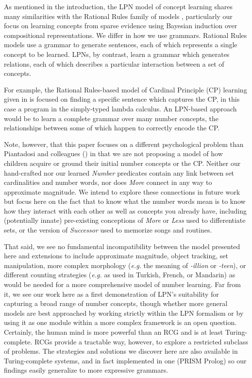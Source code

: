 \documentclass[10pt,letterpaper]{article}
\begin{document}
As mentioned in the introduction, the LPN model of concept learning
shares many similarities with the Rational Rules family of models
\citep{goodman2008rational,T.D.Ullman:2012:1b1b6,PianGoodTen2012},
particularly our focus on learning concepts from sparse evidence using
Bayesian induction over compositional representations. We differ in
how we use grammars. Rational Rules models use a grammar to generate
sentences, each of which represents a single concept to be learned.
LPNs, by contrast, learn a grammar which generates relations, each of
which describes a particular interaction between a set of concepts.

For example, the Rational Rules-based model of Cardinal Principle (CP)
learning given in \citep{PianGoodTen2012} is focused on finding a
specific sentence which captures the CP, in this case a program in the
simply-typed lambda calculus. An LPN-based approach would be to learn
a complete grammar over many number concepts, the relationships
between some of which happen to correctly encode the CP.

Note, however, that this paper focuses on a different psychological
problem than Piantadosi and colleagues (\citeyear{PianGoodTen2012}) in
that we are not proposing a model of how children acquire or ground
their initial number concepts or the CP. Neither our hand-crafted nor
our learned \emph{Number} predicates contain any link between set
cardinalities and number words, nor does \emph{More} connect in any
way to approximate magnitude. We intend to explore these connections
in future work but focus here on the fact that to know what the number
words mean is to know how they interact with each other as well as
concepts you already have, including (potentially innate) pre-existing
conceptions of \emph{More} or \emph{Less} used to differentiate sets,
or the version of \emph{Successor} used to memorize songs and
routines.

That said, we see no fundamental incompatibility between the model
presented here and extensions to include approximate magnitude, object
tracking, set manipulation, more complex morphology ({\it e.g.} the
meaning of \emph{-illion} or \emph{-teen}), or different counting
strategies ({\it e.g.} as used in Turkish, French, or Mandarin) as
would be needed for a more comprehensive model of number learning. Far
from it, we see our work here as a first demonstration of LPN's
suitability for capturing a broad range of number concepts, though
whether more general models are best approached by working strictly
within the LPN formalism or by using it as one module within a more
complex framework is an open question. Certainly, the human mind is
more powerful than an RCG and is at least Turing-complete. RCGs
provide a tractable way, however, to explore a restricted subclass of
problems. The strategies and solutions we discover here are also
available in Turing-complete systems, and in fact implemented in one
(PRISM Prolog) so our findings easily generalize to more expressive
grammars.
\end{document}
